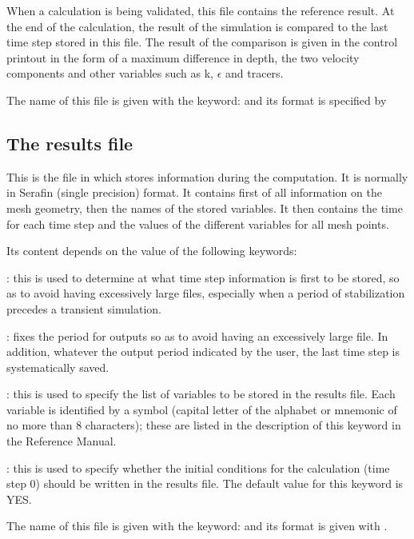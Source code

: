  When a calculation is being validated, this file contains the reference result. At the end of the calculation, the result of the simulation is compared to the last time step stored in this file. The result of the comparison is given in the control printout in the form of a maximum difference in depth, the two velocity components and other variables such as k, $\epsilon$ and tracers.

 The name of this file is given with the keyword:  and its format is specified by 


\subsection{ The results file}

 This is the file in which  stores information during the computation. It is normally in Serafin (single precision) format. It contains first of all information on the mesh geometry, then the names of the stored variables. It then contains the time for each time step and the values of the different variables for all mesh points.

 Its content depends on the value of the following keywords:

 : this is used to determine at what time step information is first to be stored, so as to avoid having excessively large files, especially when a period of stabilization precedes a transient simulation.

 : fixes the period for outputs so as to avoid having an excessively large file. In addition, whatever the output period indicated by the user, the last time step is systematically saved.

 : this is used to specify the list of variables to be stored in the results file. Each variable is identified by a symbol (capital letter of the alphabet or mnemonic of no more than 8 characters); these are listed in the description of this keyword in the Reference Manual.

  : this is used to specify whether the initial conditions for the calculation (time step 0) should be written in the results file. The default value for this keyword is YES.

 The name of this file is given with the keyword:  and its format is given with .

